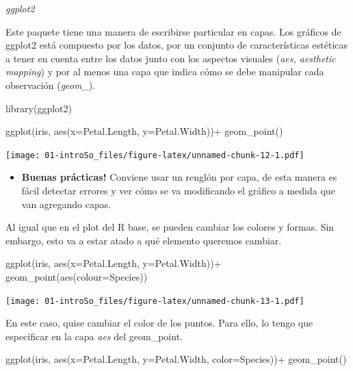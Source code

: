 \documentclass[
]{book}
\newenvironment{Shaded}{\begin{snugshade}}{\end{snugshade}}
\newcommand{\AttributeTok}[1]{\textcolor[rgb]{0.77,0.63,0.00}{#1}}
\newcommand{\FunctionTok}[1]{\textcolor[rgb]{0.00,0.00,0.00}{#1}}
\newcommand{\NormalTok}[1]{#1}
\newcommand{\SpecialCharTok}[1]{\textcolor[rgb]{0.00,0.00,0.00}{#1}}
\providecommand{\tightlist}{%
  \setlength{\itemsep}{0pt}\setlength{\parskip}{0pt}}
\begin{document}
\emph{ggplot2}

Este paquete tiene una manera de escribirse particular en capas. Los gráficos de ggplot2 está compuesto por los datos, por un conjunto de características estéticas a tener en cuenta entre los datos junto con los aspectos visuales (\emph{aes, aesthetic mapping}) y por al menos una capa que indica cómo se debe manipular cada observación (\emph{geom\_}).

\begin{Shaded}
\begin{Highlighting}[]
\FunctionTok{library}\NormalTok{(ggplot2)}

\FunctionTok{ggplot}\NormalTok{(iris, }\FunctionTok{aes}\NormalTok{(}\AttributeTok{x=}\NormalTok{Petal.Length, }\AttributeTok{y=}\NormalTok{Petal.Width))}\SpecialCharTok{+}
  \FunctionTok{geom\_point}\NormalTok{()}
\end{Highlighting}
\end{Shaded}

\texttt{[image: 01-introSo\_files/figure-latex/unnamed-chunk-12-1.pdf]}

\begin{itemize}
\tightlist
\item
  \textbf{Buenas prácticas!} Conviene usar un renglón por capa, de esta manera es fácil detectar errores y ver cómo se va modificando el gráfico a medida que van agregando capas.
\end{itemize}

Al igual que en el plot del R base, se pueden cambiar los colores y formas. Sin embargo, esto va a estar atado a qué elemento queremos cambiar.

\begin{Shaded}
\begin{Highlighting}[]
\FunctionTok{ggplot}\NormalTok{(iris, }\FunctionTok{aes}\NormalTok{(}\AttributeTok{x=}\NormalTok{Petal.Length, }\AttributeTok{y=}\NormalTok{Petal.Width))}\SpecialCharTok{+}
  \FunctionTok{geom\_point}\NormalTok{(}\FunctionTok{aes}\NormalTok{(}\AttributeTok{colour=}\NormalTok{Species)) }
\end{Highlighting}
\end{Shaded}

\texttt{[image: 01-introSo\_files/figure-latex/unnamed-chunk-13-1.pdf]}

En este caso, quise cambiar el color de los puntos. Para ello, lo tengo que especificar en la capa \emph{aes} del geom\_point.

\begin{Shaded}
\begin{Highlighting}[]
\FunctionTok{ggplot}\NormalTok{(iris, }\FunctionTok{aes}\NormalTok{(}\AttributeTok{x=}\NormalTok{Petal.Length, }\AttributeTok{y=}\NormalTok{Petal.Width, }\AttributeTok{color=}\NormalTok{Species))}\SpecialCharTok{+}
  \FunctionTok{geom\_point}\NormalTok{() }
\end{Highlighting}
\end{Shaded}
\end{document}
